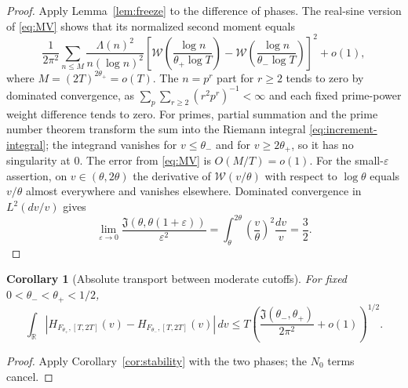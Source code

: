 \documentclass[11pt,leqno]{amsart}
\numberwithin{equation}{section}
\newtheorem{corollary}[theorem]{Corollary}
\theoremstyle{definition}
\theoremstyle{remark}
\newcommand{\R}{\mathbb R}
\newcommand{\1}{\mathbf 1}
\newcommand{\tW}{\mathscr W}
\begin{document}
\begin{proof}
Apply Lemma~\ref{lem:freeze} to the difference of phases. The real-sine version of \eqref{eq:MV} shows that its normalized second moment equals
\[
 \frac1{2\pi^2}\sum_{n\le M}
 \frac{\Lambda(n)^2}{n(\log n)^2}
 \left[\tW\left(\frac{\log n}{\theta_+\log T}\right)-
 \tW\left(\frac{\log n}{\theta_-\log T}\right)\right]^2+o(1),
\]
where $M=(2T)^{2\theta_+}=o(T)$. The $n=p^r$ part for $r\ge2$ tends to zero by dominated convergence, as $\sum_p\sum_{r\ge2}(r^2p^r)^{-1}<\infty$ and each fixed prime-power weight difference tends to zero. For primes, partial summation and the prime number theorem transform the sum into the Riemann integral \eqref{eq:increment-integral}; the integrand vanishes for $v\le\theta_-$ and for $v\ge2\theta_+$, so it has no singularity at $0$. The error from \eqref{eq:MV} is $O(M/T)=o(1)$.
For the small-$\varepsilon$ assertion, on $v\in(\theta,2\theta)$ the derivative of $\tW(v/\theta)$ with respect to $\log\theta$ equals $v/\theta$ almost everywhere and vanishes elsewhere. Dominated convergence in $L^2(dv/v)$ gives
\[
 \lim_{\varepsilon\to0}\frac{\mathfrak J(\theta,\theta(1+\varepsilon))}{\varepsilon^2}
 =\int_\theta^{2\theta}\left(\frac v\theta\right)^2\frac{dv}{v}=\frac32.
\]
\end{proof}
\begin{corollary}[Absolute transport between moderate cutoffs]\label{cor:small-theta-transport}
For fixed $0<\theta_-<\theta_+<1/2$,
\begin{equation}\label{eq:transport-moderate}
 \int_\R|H_{F_{\theta_+},[T,2T]}(v)-H_{F_{\theta_-},[T,2T]}(v)|\,dv
 \le T\left(\frac{\mathfrak J(\theta_-,\theta_+)}{2\pi^2}+o(1)\right)^{1/2}.
\end{equation}
\end{corollary}
\begin{proof}
Apply Corollary~\ref{cor:stability} with the two phases; the $N_0$ terms cancel.
\end{proof}
\end{document}
